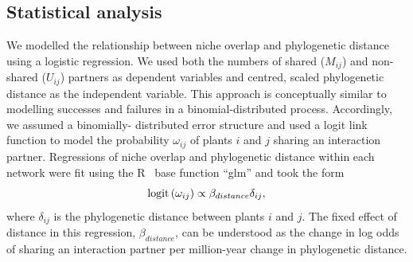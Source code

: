\documentclass[12pt]{article}
\begin{document}
\begin{spacing}{1.5}


  \subsection*{Statistical analysis} 

    We modelled the relationship between niche overlap and phylogenetic 
    distance using a logistic regression. We used both the numbers of shared 
    ($M_{ij}$) and non-shared ($U_{ij}$) partners as dependent variables and 
    centred, scaled phylogenetic distance as the independent variable. This 
    approach is conceptually similar to modelling successes and failures in a 
    binomial-distributed process. Accordingly, we assumed a binomially-  distributed error structure and used a logit link function to model the 
    probability $\omega_{ij}$ of plants $i$ and $j$ sharing an interaction 
    partner. Regressions of niche overlap and phylogenetic distance within 
    each network were fit using the R~\citep{R} base function ``glm'' and 
    took the form
      \begin{equation}
        {\rm logit}\left(\omega_{ij}\right) \propto \beta_{distance}\delta_{ij} ,
        \label{basic}
      \end{equation}
    where $\delta_{ij}$ is the phylogenetic distance between plants $i$ and 
    $j$. The fixed effect of distance in this regression, $\beta_{distance}$, 
    can be understood as the change in log odds of sharing an interaction 
    partner per million-year change in phylogenetic distance. 



\end{spacing}
\end{document}
